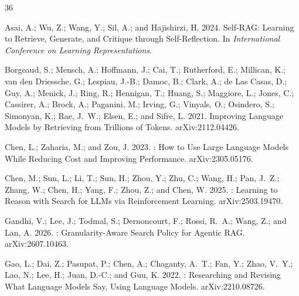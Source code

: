 \begin{thebibliography}{36}
\providecommand{\natexlab}[1]{#1}

Asai, A.; Wu, Z.; Wang, Y.; Sil, A.; and Hajishirzi, H. 2024.
\newblock Self-{RAG}: Learning to Retrieve, Generate, and Critique through Self-Reflection.
\newblock In \emph{International Conference on Learning Representations}.

Borgeaud, S.; Mensch, A.; Hoffmann, J.; Cai, T.; Rutherford, E.; Millican, K.; van den Driessche, G.; Lespiau, J.-B.; Damoc, B.; Clark, A.; de Las Casas, D.; Guy, A.; Menick, J.; Ring, R.; Hennigan, T.; Huang, S.; Maggiore, L.; Jones, C.; Cassirer, A.; Brock, A.; Paganini, M.; Irving, G.; Vinyals, O.; Osindero, S.; Simonyan, K.; Rae, J.~W.; Elsen, E.; and Sifre, L. 2021.
\newblock Improving Language Models by Retrieving from Trillions of Tokens.
\newblock arXiv:2112.04426.

Chen, L.; Zaharia, M.; and Zou, J. 2023.
: How to Use Large Language Models While Reducing Cost and Improving Performance.
\newblock arXiv:2305.05176.

Chen, M.; Sun, L.; Li, T.; Sun, H.; Zhou, Y.; Zhu, C.; Wang, H.; Pan, J.~Z.; Zhang, W.; Chen, H.; Yang, F.; Zhou, Z.; and Chen, W. 2025.
: Learning to Reason with Search for {LLMs} via Reinforcement Learning.
\newblock arXiv:2503.19470.

Gandhi, V.; Lee, J.; Todmal, S.; Dernoncourt, F.; Rossi, R.~A.; Wang, Z.; and Lan, A. 2026.
: Granularity-Aware Search Policy for Agentic {RAG}.
\newblock arXiv:2607.10463.

Gao, L.; Dai, Z.; Pasupat, P.; Chen, A.; Chaganty, A.~T.; Fan, Y.; Zhao, V.~Y.; Lao, N.; Lee, H.; Juan, D.-C.; and Guu, K. 2022.
: Researching and Revising What Language Models Say, Using Language Models.
\newblock arXiv:2210.08726.


\end{thebibliography}
